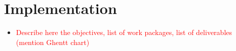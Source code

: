 \documentclass[12pt, a4paper]{article} %
\begin{document}
\section{Implementation}


\begin{itemize}
\item \textcolor{red}{Describe here the objectives, list of work
    packages, list of deliverables (mention Ghentt chart)}
  \end{itemize}

\end{document}
